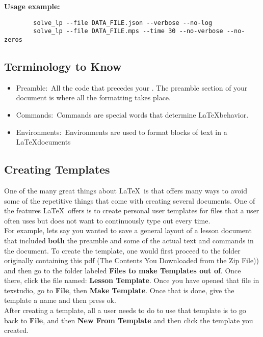 \documentclass[12pt,hidelinks]{article}
\begin{document}
	\textbf{Usage example:} 
	\begin{verbatim}
		solve_lp --file DATA_FILE.json --verbose --no-log
		solve_lp --file DATA_FILE.mps --time 30 --no-verbose --no-zeros
	\end{verbatim}


	\subsection{Terminology to Know}
			\begin{itemize}
				\item Preamble:\, All the code that precedes your . The preamble section of your document is where all the formatting takes place. 
				\item Commands:\, Commands are special words that determine \LaTeX behavior.
				\item Environments:\, Environments are used to format blocks of text in a \LaTeX documents
			\end{itemize}
	\subsection{Creating Templates}
		One of the many great things about \LaTeX\ is that offers many ways to avoid some of the repetitive things that come with creating several documents. One of the features \LaTeX\ offers is to create personal user templates for files that a user often uses but does not want to continuously type out every time.\\
		For example, lets say you wanted to save a general layout of a lesson document that included \textbf{both} the preamble and some of the actual text and commands in the document. 
		To create the template, one would first proceed to the folder originally containing this pdf (The Contents You Downloaded from the Zip File)) and then go to the folder labeled \textbf{Files to make Templates out of}. Once there, click the file named: \textbf{Lesson Template}. Once you have opened that file in texstudio, go to \textbf{File}, then \textbf{Make Template}. Once that is done, give the template a name and then press ok.\\
		After creating a template, all a user needs to do to use that template is to go back to \textbf{File}, and then \textbf{New From Template} and then click the template you created.
	\vspace{-1.5mm}
\newpage

\end{document}
